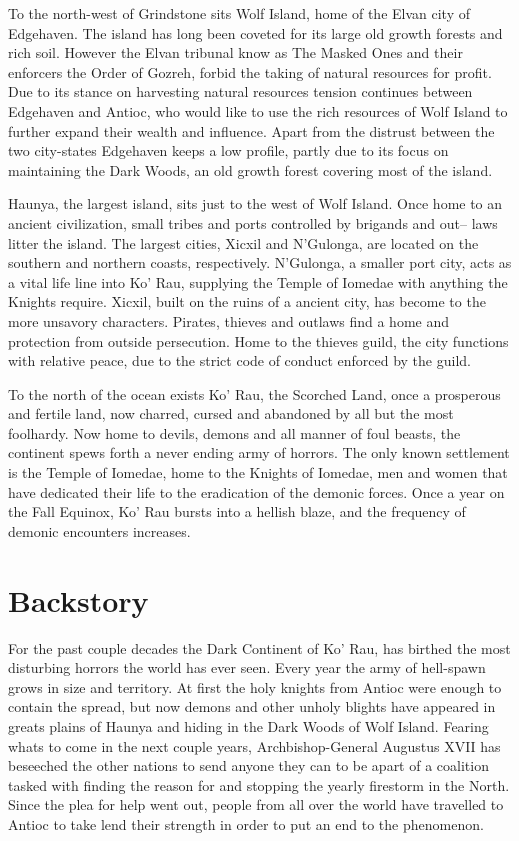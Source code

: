 To the north-west of Grindstone sits Wolf Island, home of the Elvan city of 
Edgehaven. The island has long been coveted for its large old growth forests and 
rich soil.  However the Elvan tribunal know as The Masked Ones and their enforcers
the Order of Gozreh, forbid the taking of natural resources for profit.  Due to
its stance on harvesting natural resources tension continues between Edgehaven and 
Antioc, who would like to use the rich resources of Wolf Island to further expand
their wealth and influence.  Apart from the distrust between the two city-states
Edgehaven keeps a low profile, partly due to its focus on maintaining the Dark 
Woods, an old growth forest covering most of the island.

Haunya, the largest island, sits just to the west of Wolf Island.  Once home to
an ancient civilization, small tribes and ports controlled by brigands and out--
laws litter the island.  The largest cities, Xicxil and N'Gulonga, are located on
the southern and northern coasts, respectively.  N'Gulonga, a smaller port city,
acts as a vital life line into Ko' Rau, supplying the Temple of Iomedae with anything
the Knights require.  Xicxil, built on the ruins of a ancient city, has become
to the more unsavory characters.  Pirates, thieves and outlaws find a home and
protection from outside persecution.  Home to the thieves guild, the city functions
with relative peace, due to the strict code of conduct enforced by the guild.

To the north of the ocean exists Ko' Rau, the Scorched Land, once a prosperous and 
fertile land, now charred, cursed and abandoned by all but the most foolhardy.  Now
home to devils, demons and all manner of foul beasts, the continent spews forth 
a never ending army of horrors.  The only known settlement is the Temple of Iomedae,
home to the Knights of Iomedae, men and women that have dedicated their life to 
the eradication of the demonic forces.  Once a year on the Fall Equinox, Ko' Rau 
bursts into a hellish blaze, and the frequency of demonic encounters increases.

\section{Backstory}

For the past couple decades the Dark Continent of Ko' Rau, has birthed the most
disturbing horrors the world has ever seen.  Every year the army of hell-spawn
grows in size and territory.  At first the holy knights from Antioc were enough
to contain the spread, but now demons and other unholy blights have appeared in 
greats plains of Haunya and hiding in the Dark Woods of Wolf Island.  Fearing 
whats to come in the next couple years, Archbishop-General Augustus XVII has 
beseeched the other nations to send anyone they can to be apart of a coalition 
tasked with finding the reason for and stopping the yearly firestorm in the North.
Since the plea for help went out, people from all over the world have travelled 
to Antioc to take lend their strength in order to put an end to the phenomenon.

